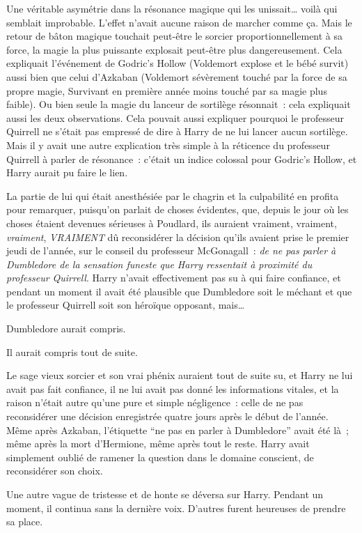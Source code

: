 Une véritable asymétrie dans la résonance magique qui les unissait… voilà qui semblait improbable. L'effet n'avait aucune raison de marcher comme ça. Mais le retour de bâton magique touchait peut-être le sorcier proportionnellement à sa force, la magie la plus puissante explosait peut-être plus dangereusement. Cela expliquait l'événement de Godric's Hollow (Voldemort explose et le bébé survit) aussi bien que celui d'Azkaban (Voldemort sévèrement touché par la force de sa propre magie, Survivant en première année moins touché par sa magie plus faible). Ou bien seule la magie du lanceur de sortilège résonnait~: cela expliquait aussi les deux observations. Cela pouvait aussi expliquer pourquoi le professeur Quirrell ne s'était pas empressé de dire à Harry de ne lui lancer aucun sortilège. Mais il y avait une autre explication très simple à la réticence du professeur Quirrell à parler de résonance~: c'était un indice colossal pour Godric's Hollow, et Harry aurait pu faire le lien.

La partie de lui qui était anesthésiée par le chagrin et la culpabilité en profita pour remarquer, puisqu'on parlait de choses évidentes, que, depuis le jour où les choses étaient devenues sérieuses à Poudlard, ils auraient vraiment, vraiment, \emph{vraiment}, \emph{VRAIMENT} dû reconsidérer la décision qu'ils avaient prise le premier jeudi de l'année, sur le conseil du professeur McGonagall~: \emph{de ne pas parler à Dumbledore de la sensation funeste que Harry ressentait à proximité du professeur Quirrell}. Harry n'avait effectivement pas su à qui faire confiance, et pendant un moment il avait été plausible que Dumbledore soit le méchant et que le professeur Quirrell soit son héroïque opposant, mais…

Dumbledore aurait compris.

Il aurait compris tout de suite.

Le sage vieux sorcier et son vrai phénix auraient tout de suite su, et Harry ne lui avait pas fait confiance, il ne lui avait pas donné les informations vitales, et la raison n'était autre qu'une pure et simple négligence~: celle de ne pas reconsidérer une décision enregistrée quatre jours après le début de l'année. Même après Azkaban, l'étiquette “ne pas en parler à Dumbledore” avait été là~; même après la mort d'Hermione, même après tout le reste. Harry avait simplement oublié de ramener la question dans le domaine conscient, de reconsidérer son choix.

Une autre vague de tristesse et de honte se déversa sur Harry. Pendant un moment, il continua sans la dernière voix. D'autres furent heureuses de prendre sa place.

